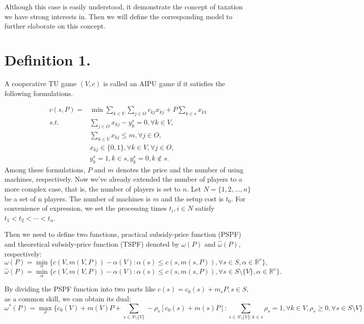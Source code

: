 \documentclass[UTF8]{article}
\begin{document}
Although this case is easily understood, it demonstrate the concept of taxation we have strong interests in. Then we will define the corresponding model to further elaborate on this concept.

\section*{Definition 1.}

A cooperative TU game $(V,c)$ is called an AIPU game if it satisfies the following formulations.

\[
\begin{aligned}
c(s,P) = & {\min} \sum_{k\in V}\sum_{j\in O} {c_{kj} x_{kj}} + {P\sum_{k\in s} x_{k1}} \\
{s.t.}\quad & \sum_{j \in O} x_{kj}-y_k^s=0, \forall k \in V, \\
& \sum_{k\in V} x_{kj} \leq m,\forall j \in O,  \\
& x_{kj} \in \{0,1\} , \forall k \in V, \forall j \in O,\\
& y_k^s=1, k \in s, y_k^s=0, k \notin s.
\end{aligned}
\]
Among these formulations, $P$ and $m$ denotes the price and the number of using machines, respectively.
Now we've already extended the number of players to a more complex case, that is, the number of players is set to $n$.
Let $N=\{1,2,\ldots,n\}$ be a set of n players. The number of machines is $m$ and the setup cost is $t_0$.
For convenience of expression, we set the processing times $t_i, i\in N$ satisfy $t_1<t_2<\cdots<t_n$.

Then we need to define two functions, practical subsidy-price function (PSPF) and theoretical subsidy-price function (TSPF) denoted by $\omega(P)$ and $\hat{\omega}(P)$, respectively:
\[
  {\omega(P)}=\mathop{\min}_{\alpha}\{c(V,m(V,P))-\alpha(V): \alpha(s)\leq c(s,m(s,P))
 ,\forall s \in S, \alpha\in\mathbb{R}^{v}\},
\]
\[
  {\hat{\omega}(P)}=\mathop{\min}_{\alpha}\{c(V,m(V,P))-\alpha(V): \alpha(s)\leq c(s,m(s,P))
 ,\forall s \in S\setminus\{V\}, \alpha\in\mathbb{R}^{v}\}.
\]

By dividing the PSPF function into two parts like $c(s)=c_0(s)+m_sP, s \in S$, as a common skill, we can obtain its dual:
\begin{equation}\label{dual}
 {\omega^*(P)}=\mathop{\max}_{\rho} \{c_0(V)+m(V)P+\sum_{s\in S\setminus\{V\}}-\rho_s[c_0(s)+m(s)P]:
 \sum_{s\in S\setminus\{V\}:k\in s}\rho_s=1,\forall k \in V,\rho_s\geq 0,\forall s \in S \setminus{V}\}
\end{equation}
\end{document}
